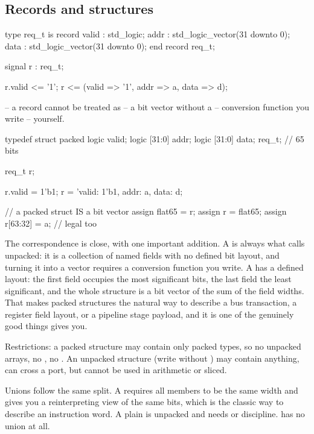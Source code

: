 \subsection{Records and structures}

\begin{rosetta}
\begin{rleft}
type req_t is record
  valid : std_logic;
  addr  : std_logic_vector(31 downto 0);
  data  : std_logic_vector(31 downto 0);
end record req_t;

signal r : req_t;

r.valid <= '1';
r <= (valid => '1',
      addr  => a,
      data  => d);

-- a record cannot be treated as
-- a bit vector without a
-- conversion function you write
-- yourself.
\end{rleft}
\begin{rright}
typedef struct packed {
  logic        valid;
  logic [31:0] addr;
  logic [31:0] data;
} req_t;                  // 65 bits

req_t r;

r.valid = 1'b1;
r = '{valid: 1'b1,
      addr:  a,
      data:  d};

// a packed struct IS a bit vector
assign flat65 = r;
assign r      = flat65;
assign r[63:32] = a;   // legal too
\end{rright}
\end{rosetta}


The correspondence is close, with one important addition. A \VHDL{}
 is always what \SV{} calls unpacked: it is a collection of named
fields with no defined bit layout, and turning it into a vector requires a
conversion function you write. A \SV{}  has a defined
layout: the first field occupies the most significant bits, the last field the
least significant, and the whole structure is a bit vector of the sum of the
field widths. That makes packed structures the natural way to describe a bus
transaction, a register field layout, or a pipeline stage payload, and it is
one of the genuinely good things \SV{} gives you.

Restrictions: a packed structure may contain only packed types, so no
unpacked arrays, no , no . An unpacked structure (write
 without ) may contain anything, can cross a port, but
cannot be used in arithmetic or sliced.

Unions follow the same split. A  requires all members to be
the same width and gives you a reinterpreting view of the same bits, which is
the classic way to describe an instruction word. A plain  is
unpacked and needs  or  discipline. \VHDL{} has no
union at all.

